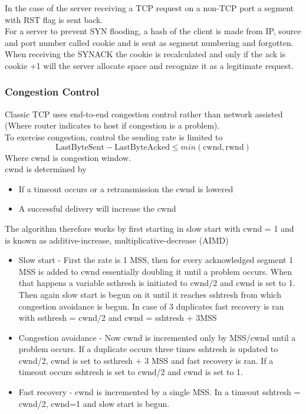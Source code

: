 \documentclass[12pt, a4paper]{article}
\begin{document}
				In the case of the server receiving a TCP request on a non-TCP port a segment with RST flag is sent back.\\
				For a server to prevent SYN flooding, a hash of the client is made from IP, source and port number called cookie and is sent as segment numbering and forgotten.\\
				When receiving the SYNACK the cookie is recalculated and only if the ack is cookie +1 will the server allocate space and recognize it as a legitimate request.\\
			\subsubsection{Congestion Control}
				Classic TCP uses end-to-end congestion control rather than network assisted (Where router indicates to host if congestion is a problem).\\
				To exercise congestion, control the sending rate is limited to
				$$\text{LastByteSent} - \text{LastByteAcked} \leq min(\text{cwnd},\text{rwnd})$$
				Where cwnd is congestion window.\\
				cwnd is determined by
				\begin{itemize}
					\item If a timeout occurs or a retransmission the cwnd is lowered
					\item A successful delivery will increase the cwnd
				\end{itemize}
				The algorithm therefore works by first starting in slow start with cwnd = 1 and is known as additive-increase, multiplicative-decrease (AIMD)
				\begin{itemize}
					\item Slow start - First the rate is 1 MSS, then for every acknowledged segment 1 MSS is added to cwnd essentially doubling it until a problem occurs. When that happens a variable ssthresh is initiated to cwnd/2 and cwnd is set to 1. Then again slow start is begun on it until it reaches sshtresh from which congestion avoidance is begun. In case of 3 duplicates fast recovery is ran with ssthresh = cwnd/2 and cwnd = sshtresh + 3MSS
					\item Congestion avoidance - Now cwnd is incremented only by MSS/cwnd until a problem occurs. If a duplicate occurs three times sshtresh is updated to cwnd/2, cwnd is set to ssthresh + 3 MSS and fast recovery is ran. If a timeout occurs sshtresh is set to cwnd/2 and cwnd is set to 1.
					\item Fast recovery - cwnd is incremented by a single MSS. In a timeout sshtresh = cwnd/2, cwnd=1 and slow start is begun.
				\end{itemize}
\end{document}
